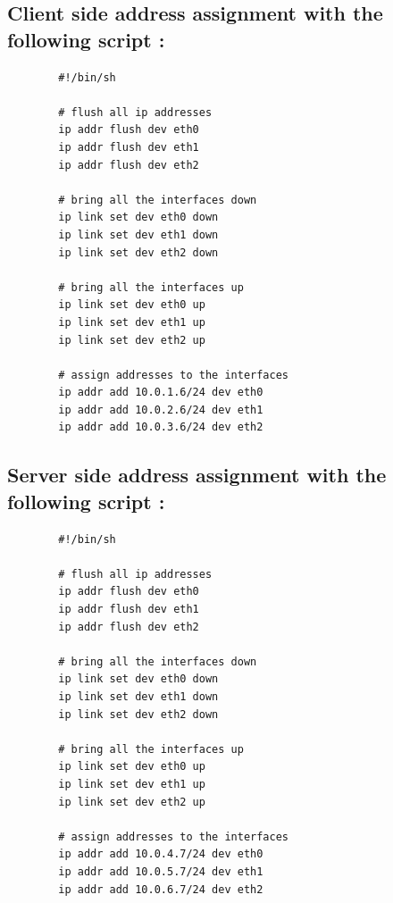 \documentclass[a4paper,11pt]{article}
\begin{document}
	 	\subsection{Client side address assignment with the following script :}
	 	\label{subsec:clientaddress}
	 	\begin{lstlisting}
	 	#!/bin/sh

	 	# flush all ip addresses
	 	ip addr flush dev eth0
	 	ip addr flush dev eth1
	 	ip addr flush dev eth2

	 	# bring all the interfaces down
	 	ip link set dev eth0 down
	 	ip link set dev eth1 down
	 	ip link set dev eth2 down

	 	# bring all the interfaces up
	 	ip link set dev eth0 up
	 	ip link set dev eth1 up
	 	ip link set dev eth2 up

	 	# assign addresses to the interfaces
	 	ip addr add 10.0.1.6/24 dev eth0
	 	ip addr add 10.0.2.6/24 dev eth1
	 	ip addr add 10.0.3.6/24 dev eth2
	 	\end{lstlisting}

	 	\subsection{Server side address assignment with the following script :}
	 	\label{subsec:serveraddress}
	 	\begin{lstlisting}
	 	#!/bin/sh

	 	# flush all ip addresses
	 	ip addr flush dev eth0
	 	ip addr flush dev eth1
	 	ip addr flush dev eth2

	 	# bring all the interfaces down
	 	ip link set dev eth0 down
	 	ip link set dev eth1 down
	 	ip link set dev eth2 down

	 	# bring all the interfaces up
	 	ip link set dev eth0 up
	 	ip link set dev eth1 up
	 	ip link set dev eth2 up

	 	# assign addresses to the interfaces
	 	ip addr add 10.0.4.7/24 dev eth0
	 	ip addr add 10.0.5.7/24 dev eth1
	 	ip addr add 10.0.6.7/24 dev eth2
	 	\end{lstlisting}
\end{document}
